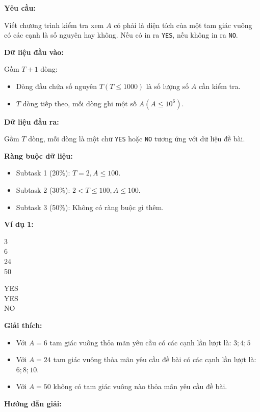\documentclass[12pt]{scrartcl}  %
\begin{document}
\textbf{Yêu cầu:}

Viết chương trình kiểm tra xem $A$ có phải là diện tích của một tam giác vuông có các cạnh là số nguyên hay không. 
Nếu có in ra \texttt{YES}, nếu không in ra \texttt{NO}.

\textbf{Dữ liệu đầu vào:}

Gồm $T + 1$ dòng:
\begin{itemize}
    \item Dòng đầu chứa số nguyên $T (T \leq 1000)$ là số lượng số $A$ cần kiểm tra. 
    \item $T$ dòng tiếp theo, mỗi dòng ghi một số $A (A \leq 10^6)$.
\end{itemize}

\textbf{Dữ liệu đầu ra:}

Gồm $T$ dòng, mỗi dòng là một chữ \texttt{YES} hoặc \texttt{NO} tương ứng với dữ liệu đề bài.

\textbf{Ràng buộc dữ liệu:}
\begin{itemize}
    \item Subtask 1 (20\%): $T = 2, A \leq 100$.
    \item Subtask 2 (30\%): $2 < T \leq 100, A \leq 100$.
    \item Subtask 3 (50\%): Không có ràng buộc gì thêm.
\end{itemize}

\textbf{Ví dụ 1:}
\begin{tcolorbox}[colback=gray!5!white, colframe=blue!50!black, title=Input]
3\\
6\\
24\\
50
\end{tcolorbox}
\begin{tcolorbox}[colback=gray!5!white, colframe=green!50!black, title=Output]
YES\\
YES\\
NO
\end{tcolorbox}

\textbf{Giải thích:}
\begin{itemize}
    \item Với $A = 6$ tam giác vuông thỏa mãn yêu cầu có các cạnh lần lượt là: $3;4;5$
    \item Với $A = 24$ tam giác vuông thỏa mãn yêu cầu đề bài có các cạnh lần lượt là: $6;8;10$.
    \item Với $A = 50$ không có tam giác vuông nào thỏa mãn yêu cầu đề bài.
\end{itemize}

\textbf{Hướng dẫn giải:}
\end{document}
